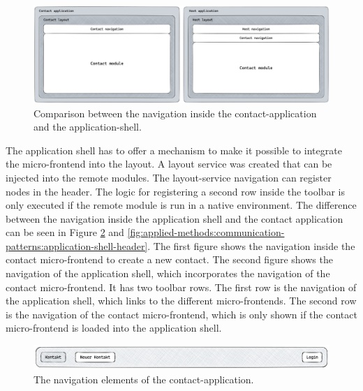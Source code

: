 \ifshowImages
  \begin{figure}[H]
  \centering
  \includegraphics[width=1\linewidth]{images/applied-methods/communication-patterns/layout-comparison.jpg}
  \caption{Comparison between the navigation inside the contact-application and the application-shell.}\label{fig:applied-methods:communication-patterns:comparison-between-host-and-contact-layout}
  \end{figure}
\fi

\noindent The application shell has to offer a mechanism to make it possible to integrate the micro-frontend into the layout. A layout service was created that can be injected into the remote modules. The layout-service navigation can register nodes in the header. The logic for registering a second row inside the toolbar is only executed if the remote module is run in a native environment. The difference between the navigation inside the application shell and the contact application can be seen in Figure \ref{fig:applied-methods:communication-patterns:contact-application-header} and \ref{fig:applied-methods:communication-patterns:application-shell-header}. The first figure shows the navigation inside the contact micro-frontend to create a new contact. The second figure shows the navigation of the application shell, which incorporates the navigation of the contact micro-frontend. It has two toolbar rows. The first row is the navigation of the application shell, which links to the different micro-frontends. The second row is the navigation of the contact micro-frontend, which is only shown if the contact micro-frontend is loaded into the application shell.

\ifshowImages
  \begin{figure}[H]
  \centering
  \includegraphics[width=1\linewidth]{images/applied-methods/communication-patterns/contact-header.png}
  \caption{The navigation elements of the contact-application.}\label{fig:applied-methods:communication-patterns:contact-application-header}
  \end{figure}
\fi

